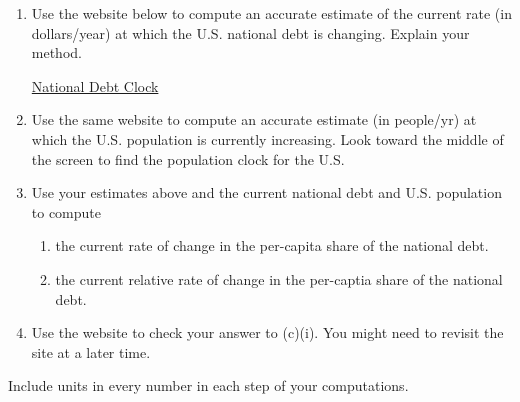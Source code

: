 \documentclass{ximera}
\begin{document}
\begin{question}  \label{Qdfgggtre}
\begin{enumerate}
\item Use the website below to compute an accurate estimate of the current rate (in dollars/year) at which the U.S. national debt is changing. Explain your method. 

\href{https://www.usdebtclock.org/}{National Debt Clock}

\item Use the same website to compute an accurate estimate (in people/yr) at which the U.S. population is currently increasing. Look toward the middle of the screen to find the population clock for the U.S.


\item Use your estimates above and the current national debt and U.S. population to compute

\begin{enumerate}
   \item the current rate of change in the per-capita share of the national debt.

    \item the current relative rate of change in the per-captia share of the national debt.
\end{enumerate}

\item Use the website to check your answer to (c)(i). You might need to revisit the site at a later time.
\end{enumerate} 

Include units in every number in each step of your computations.

\end{question}
\end{document}
